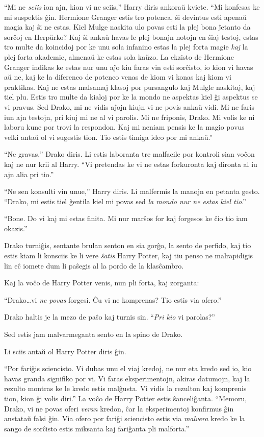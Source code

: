 ``Mi ne \emph{sciis} ion ajn, kion vi ne sciis,'' Harry diris ankoraŭ
kviete. ``Mi konfesas ke mi suspektis ĝin. Hermione Granger estis tro
potenca, ŝi devintus esti apenaŭ magia kaj ŝi ne estas. Kiel Mulge
naskita ulo povas esti la plej bona ĵetanto da sorĉoj en Herpŭrko? Kaj
ŝi ankaŭ havas le plej bonajn notojn en ŝiaj testoj, estas tro
multe da koincidoj por ke unu sola infanino estas la plej forta magie
\emph{kaj} la plej forta akademie, almenaŭ ke estas sola kaŭzo. La
ekzisto de Hermione Granger indikas ke estas nur unu aĵo kiu faras vin
esti sorĉisto, io kion vi havas aŭ ne, kaj ke la diferenco de potenco
venas de kiom vi konas kaj kiom vi praktikas. Kaj ne estas malsamaj
klasoj por pursangulo kaj Mulgle naskitaj, kaj tiel plu. Estis tro
multe da kialoj por ke la mondo ne aspektas kiel ĝi aspektus se vi
pravus. Sed Drako, mi ne vidis aĵojn kiujn vi ne povis ankaŭ vidi. Mi
ne faris iun ajn testojn, pri kiuj mi ne al vi parolis. Mi ne
friponis, Drako. Mi volis ke ni laboru kune por trovi la
respondon. Kaj mi neniam pensis ke la magio povus velki antaŭ ol vi
sugestis tion. Tio estis timiga ideo por mi ankaŭ.''

``Ne gravas,'' Drako diris. Li estis laboranta tre malfacile por
kontroli sian voĉon kaj ne nur krii al Harry. ``Vi pretendas ke vi ne
estas forkuronta kaj dironta al iu ajn alia pri tio.''

``Ne sen konsulti vin unue,'' Harry diris. Li malfermis la manojn en
petanta gesto. ``Drako, mi estis tiel ĝentila kiel mi povas sed
\emph{la mondo nur ne estas kiel tio}.''

``Bone. Do vi kaj mi estas finita. Mi nur marŝos for kaj forgesos ke ĉio tio iam okazis.''

Drako turniĝis, sentante brulan senton en sia gorĝo, la sento de
perfido, kaj tio estis kiam li konsciis ke li vere \emph{ŝatis} Harry
Potter, kaj tiu penso ne malrapidigis lin eĉ iomete dum li paŝegis al
la pordo de la klasĉambro.

Kaj la voĉo de Harry Potter venis, nun pli forta, kaj zorganta:

``Drako\ldots{}vi \emph{ne povas} forgesi. Ĉu vi ne komprenas? Tio estis via ofero.''

Drako haltis je la mezo de paŝo kaj turnis sin. ``\emph{Pri kio} vi parolas?''

Sed estis jam malvarmeganta sento en la spino de Drako.

Li sciis antaŭ ol Harry Potter diris ĝin.

``Por fariĝis sciencisto. Vi dubas unu el viaj kredoj, ne nur eta
kredo sed io, kio havas granda signifiko por vi. Vi faras
eksperimentojn, akiras datumojn, kaj la rezulto montras ke le kredo
estis malĝusta. Vi vidis la rezulton kaj komprenis tion, kion ĝi volis
diri.'' La voĉo de Harry Potter estis ŝanceliĝanta. ``Memoru, Drako,
vi ne povas oferi \emph{veran} kredon, ĉar la eksperimentoj konfirmus
ĝin anstataŭ falsi ĝin. Via ofero por fariĝi sciencisto estis via
\emph{malvera} kredo ke la sango de sorĉisto estis miksanta kaj
fariĝanta pli malforta.''

